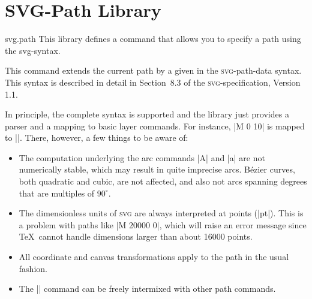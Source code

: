 %
%
%


\section{SVG-Path Library}
\label{section-library-svg-path}

\begin{pgflibrary}{svg.path}
  This library defines a command that allows you to specify a path
  using the svg-syntax.
\end{pgflibrary}

\begin{command}{\pgfpathsvg{}}
  This command extends the current path by a  given in the
  \textsc{svg}-path-data syntax. This syntax is described in detail in
  Section~8.3 of the \textsc{svg}-specification, Version 1.1.

  In principle, the complete syntax is supported and the library just
  provides a parser and a mapping to basic layer commands. For
  instance, |M 0 10| is mapped to
  |\pgfpathmoveto{\pgfpoint{0pt}{10pt}}|. There, however, a few things
  to be aware of:
  \begin{itemize}
  \item The computation underlying the arc commands |A| and |a|
    are not numerically stable, which may result in quite imprecise
    arcs. B\'ezier curves, both quadratic and cubic, are not affected,
    and also not arcs spanning degrees that are multiples of
    $90^\circ$.
  \item The dimensionless units of \textsc{svg} are always interpreted
    at points (|pt|). This is a problem with paths like |M 20000 0|,
    which will raise an error message since \TeX\ cannot handle
    dimensions larger than about 16000 points.
  \item
    All coordinate and canvas transformations apply to the path in the
    usual fashion.
  \item
    The |\pgfpathsvg| command can be freely intermixed with other path
    commands.
  \end{itemize}
\begin{codeexample}[]
\begin{pgfpicture}
\end{pgfpicture}
\end{codeexample}
\end{command}

